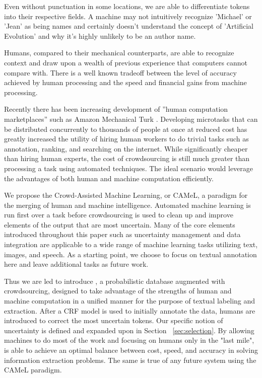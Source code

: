 {\begin{example}
Even without punctuation in some locations, we are able to
differentiate tokens into their respective fields.  A machine may
not intuitively recognize 'Michael' or 'Jean' as being names and
certainly doesn't understand the concept of 'Artificial Evolution'
and why it's highly unlikely to be an author name.
\end{example}

Humans, compared to their mechanical counterparts, are able to
recognize context and draw upon a wealth of previous experience that
computers cannot compare with.   There is a well known tradeoff
\cite{Quinn10crowdflow:integrating} between the level of accuracy
achieved by human processing and the speed and financial gains from
machine processing.

Recently there has been increasing development of ''human computation
marketplaces'' such as Amazon Mechanical Turk
\cite{Ipeirotis:2010:AAM:1869086.1869094}.  Developing microtasks
that can be distributed concurrently to thousands of people at once
at reduced cost has greatly increased the utility of hiring human
workers to do trivial tasks such as annotation, ranking, and
searching on the internet.  While significantly cheaper than hiring
human experts, the cost of crowdsourcing is still much greater than
processing a task using automated techniques.  The ideal scenario
would leverage the advantages of both human and machine computation
efficiently.

We propose the Crowd-Assisted Machine Learning, or CAMeL, a paradigm
for the merging of human and machine intelligence.  Automated
machine learning is run first over a task before crowdsourcing is
used to clean up and improve elements of the output that are most
uncertain.  Many of the core elements introduced throughout this
paper such as uncertainty management and data integration are
applicable to a wide range of machine learning tasks utilizing text,
images, and speech.  As a starting point, we choose to focus on
textual annotation here and leave additional tasks as future work.

Thus we are led to introduce \sysName, a probabilistic database
augmented with crowdsourcing, designed to take advantage of the
strengths of human and machine computation in a unified manner for
the purpose of textual labeling and extraction.  After a CRF model
is used to initially annotate the data, humans are introduced to
correct the most uncertain tokens.  Our specific notion of
uncertainty is defined and expanded upon in Section
~\ref{sec:selection}.  By allowing machines to do most of the work
and focusing on humans only in the "last mile", \sysName is able to
achieve an optimal balance between cost, speed, and accuracy in
solving information extraction problems.  The same is true of any
future system using the CAMeL paradigm.

}
